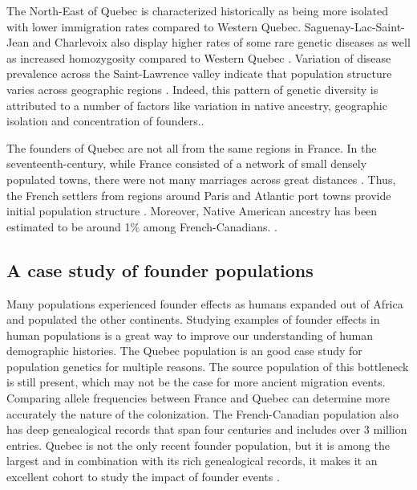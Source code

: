 \documentclass[
11pt, %
oneside, %
english, %
doublespacing, %
headsepline, %
chapterinoneline, %
]{MastersDoctoralThesis} %
\begin{document}
The North-East of Quebec is characterized historically as being more isolated with lower immigration rates compared to Western Quebec.
Saguenay-Lac-Saint-Jean and Charlevoix also display higher rates of some rare genetic diseases as well as increased homozygosity compared to Western Quebec \citep{Gagnon2001}.
Variation of disease prevalence across the Saint-Lawrence valley indicate that population structure varies across geographic regions \citep{Gagnon2001}.
Indeed, this pattern of genetic diversity is attributed to a number of factors like variation in native ancestry, geographic isolation and concentration of founders.\citep{Gagnon2001,Laberge2005,Bherer2011}.

The founders of Quebec are not all from the same regions in France.
In the seventeenth-century, while France consisted of a network of small densely populated towns, there were not many marriages across great distances \citep{Laberge2005}.
Thus, the French settlers from regions around Paris and Atlantic port towns provide initial population structure \citep{Laberge2005}.
Moreover, Native American ancestry has been estimated to be around 1\% among French-Canadians. \citep{Moreau2013}.

\subsection{A case study of founder populations}

Many populations experienced founder effects as humans expanded out of Africa and populated the other continents.
Studying examples of founder effects in human populations is a great way to improve our understanding of human demographic histories.
The Quebec population is an good case study for population genetics for multiple reasons.
The source population of this bottleneck is still present, which may not be the case for more ancient migration events. 
Comparing allele frequencies between France and Quebec can determine more accurately the nature of the colonization.
The French-Canadian population also has deep genealogical records that span four centuries and includes over 3 million entries.
Quebec is not the only recent founder population, but it is among the largest and in combination with its rich genealogical records, it makes it an excellent cohort to study the impact of founder events \citep{Larmuseau2013,Bherer2011,Gagnon2001,Roy-Gagnon2011}.
\end{document}

